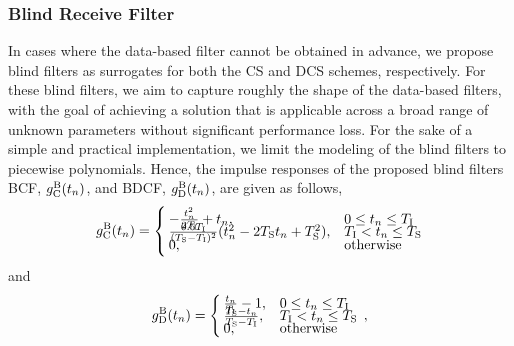 \subsubsection{Blind Receive Filter}\label{blind_filter}
\scaleSubsubsectionBelow
In cases where the data-based filter cannot be obtained in advance, we propose blind filters as surrogates for both the \ac{CS} and \ac{DCS} schemes, respectively. For these blind filters, we aim to capture roughly the shape of the data-based filters, with the goal of achieving a solution that is applicable across a broad range of unknown parameters without significant performance loss. For the sake of a simple and practical implementation, we limit the modeling of the blind filters to piecewise polynomials. Hence, the impulse responses of the proposed blind filters \ac{BCF}, $g^{\mathrm{B}}_{\mathrm{C}}(t_n)$, and \ac{BDCF}, $g^{\mathrm{B}}_{\mathrm{D}}(t_n)$, are given as follows,
\begin{equation}\label{eq:blind_corr_filter}
g_{\mathrm{C}}^{\mathrm{B}}(t_n) =
\begin{cases}
     - \frac{t_n^2}{2T_{\mathrm{I}}} + t_n, & 0\leq t_n \leq T_{\mathrm{I}}\\[-0.2cm]
     \frac{0.5T_{\mathrm{I}}}{(T_{\mathrm{S}}-T_{\mathrm{I}})^2}(t_n^2 -2T_{\mathrm{S}} t_n + T_{\mathrm{S}}^2), &  T_{\mathrm{I}} < t_n \leq  T_{\mathrm{S}}\\[-0.2cm]
     0, & \text{otherwise}
\end{cases}
\end{equation}
and
\begin{equation}\label{eq:blind_diff_corr_filter}
g_{\mathrm{D}}^{\mathrm{B}}(t_n) =
    \begin{cases}
        \frac{t_n}{T_{\mathrm{I}}} - 1, & 0\leq t_n \leq T_{\mathrm{I}}\\[-0.2cm]
        \frac{T_{\mathrm{S}} - t_n}{T_{\mathrm{S}}-T_{\mathrm{I}}}, &  T_{\mathrm{I}} < t_n \leq  T_{\mathrm{S}}\\[-0.2cm]
        0, & \mathrm{otherwise}
    \end{cases}\,,
\end{equation}
